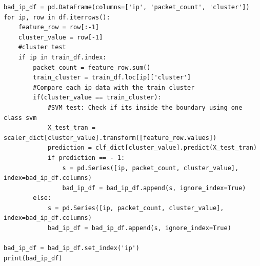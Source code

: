 \documentclass{article}
\begin{document}
\begin{verbatim}
bad_ip_df = pd.DataFrame(columns=['ip', 'packet_count', 'cluster'])
for ip, row in df.iterrows():
    feature_row = row[:-1]
    cluster_value = row[-1]
    #cluster test
    if ip in train_df.index:
        packet_count = feature_row.sum()
        train_cluster = train_df.loc[ip]['cluster']
        #Compare each ip data with the train cluster
        if(cluster_value == train_cluster):
            #SVM test: Check if its inside the boundary using one class svm
            X_test_tran = scaler_dict[cluster_value].transform([feature_row.values])
            prediction = clf_dict[cluster_value].predict(X_test_tran)
            if prediction == - 1:
                s = pd.Series([ip, packet_count, cluster_value], index=bad_ip_df.columns)
                bad_ip_df = bad_ip_df.append(s, ignore_index=True)
        else:
            s = pd.Series([ip, packet_count, cluster_value], index=bad_ip_df.columns)
            bad_ip_df = bad_ip_df.append(s, ignore_index=True)

bad_ip_df = bad_ip_df.set_index('ip')
print(bad_ip_df)
\end{verbatim}
\textbf{\Large{}}
\begin{verbatim}

\end{verbatim}
\end{document}
